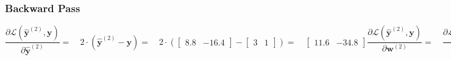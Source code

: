 \documentclass[addpoints]{exam}
\begin{document}
    \subsubsection{Backward Pass}
    \begin{subequations}
    	\begin{equation}
    		\frac{\partial\mathscr{L}(\hat{\textbf{y}}^{(2)},\textbf{y})}{\partial \hat{\textbf{y}}^{(2)}} = \quad 2 \cdot (\hat{\textbf{y}}^{(2)} - \textbf{y}) = \quad 2 \cdot (  \begin{bmatrix}
    			8.8&-16.4 
    		\end{bmatrix} - \begin{bmatrix}
    			3&1 
    		\end{bmatrix}) =\quad \begin{bmatrix}
    			11.6&-34.8
    		\end{bmatrix}
    	\end{equation}
    	\begin{equation} 
    		\frac{\partial\mathscr{L}(\hat{\textbf{y}}^{(2)},\textbf{y})}{\partial \textbf{w}^{(2)}} =\quad \frac{\partial\mathscr{L}(\hat{\textbf{y}}^{(2)},\textbf{y})}{\partial \hat{\textbf{y}}^{(2)}}\cdot \frac{\partial\hat{\textbf{y}}^{(2)}}{\partial \textbf{w}^{(2)}}
    		=  \quad   2\cdot (\hat{\textbf{y}}^{(1)} - \textbf{y}) \cdot \textbf{X}= \quad \begin{bmatrix}
    			\begin{bmatrix}
    				11.6
    			\end{bmatrix} & \begin{bmatrix}
    				-34.8
    			\end{bmatrix}
    		\end{bmatrix} \cdot \begin{bmatrix}
    			\begin{bmatrix}
    				2 \\-1
    				
    			\end{bmatrix} \begin{bmatrix}
    				-1 \\3
    				
    			\end{bmatrix}
    		\end{bmatrix}=  \quad \begin{bmatrix}
    			\begin{bmatrix}
    				23.2 \\-11.6
    				
    			\end{bmatrix}^{T} & \begin{bmatrix}
    				34.8\\-104.4
    				
    			\end{bmatrix}^{T} \end{bmatrix}
    	\end{equation}
    \end{subequations}
\end{document}
